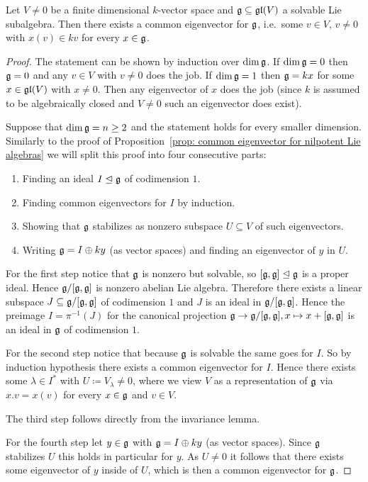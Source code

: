 \begin{thrm}[Lie]\label{thrm: Lie’s theorem}
 Let $V \neq 0$ be a finite dimensional $k$-vector space and $\mathfrak{g} \subseteq \mathfrak{gl}(V)$ a solvable Lie subalgebra. Then there exists a common eigenvector for $\mathfrak{g}$, i.e.\ some $v \in V$, $v \neq 0$ with $x(v) \in k v$ for every $x \in \mathfrak{g}$.
\end{thrm}
\begin{proof}
 The statement can be shown by induction over $\dim \mathfrak{g}$. If $\dim \mathfrak{g} = 0$ then $\mathfrak{g} = 0$ and any $v \in V$ with $v \neq 0$ does the job. If $\dim \mathfrak{g} = 1$ then $\mathfrak{g} = k x$ for some $x \in \mathfrak{gl}(V)$ with $x \neq 0$. Then any eigenvector of $x$ does the job (since $k$ is assumed to be algebraically closed and $V \neq 0$ such an eigenvector does exist).
 
 Suppose that $\dim \mathfrak{g} = n \geq 2$ and the statement holds for every smaller dimension. Similarly to the proof of Proposition~\ref{prop: common eigenvector for nilpotent Lie algebras} we will split this proof into four consecutive parts:
 \begin{enumerate}
  \item
   Finding an ideal $I \trianglelefteq \mathfrak{g}$ of codimension $1$.
  \item
   Finding common eigenvectors for $I$ by induction.
  \item
   Showing that $\mathfrak{g}$ stabilizes as nonzero subspace $U \subseteq V$ of such eigenvectors.
  \item
   Writing $\mathfrak{g} = I \oplus k y$ (as vector spaces) and finding an eigenvector of $y$ in $U$.
 \end{enumerate}
 
 For the first step notice that $\mathfrak{g}$ is nonzero but solvable, so $[\mathfrak{g},\mathfrak{g}] \trianglelefteq \mathfrak{g}$ is a proper ideal. Hence $\mathfrak{g}/[\mathfrak{g},\mathfrak{g}]$ is nonzero abelian Lie algebra. Therefore there exists a linear subspace $J \subseteq \mathfrak{g}/[\mathfrak{g},\mathfrak{g}]$ of codimension $1$ and $J$ is an ideal in $\mathfrak{g}/[\mathfrak{g},\mathfrak{g}]$. Hence the preimage $I = \pi^{-1}(J)$ for the canonical projection $\mathfrak{g} \to \mathfrak{g}/[\mathfrak{g},\mathfrak{g}], x \mapsto x + [\mathfrak{g},\mathfrak{g}]$ is an ideal in $\mathfrak{g}$ of codimension $1$.
 
 For the second step notice that because $\mathfrak{g}$ is solvable the same goes for $I$. So by induction hypothesis there exists a common eigenvector for $I$. Hence there exists some $\lambda \in I^*$ with $U \coloneqq V_\lambda \neq 0$, where we view $V$ as a representation of $\mathfrak{g}$ via $x.v = x(v)$ for every $x \in \mathfrak{g}$ and $v \in V$.
 
 The third step follows directly from the invariance lemma.
 
 For the fourth step let $y \in \mathfrak{g}$ with $\mathfrak{g} = I \oplus k y$ (as vector spaces). Since $\mathfrak{g}$ stabilizes $U$ this holds in particular for $y$. As $U \neq 0$ it follows that there exists some eigenvector of $y$ inside of $U$, which is then a common eigenvector for $\mathfrak{g}$.
\end{proof}


